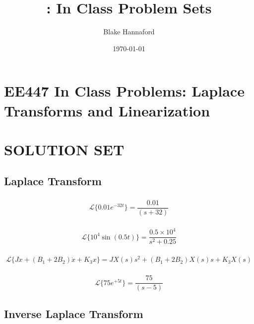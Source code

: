 \documentclass{article}	%
\title{\EEcourse: In Class Problem Sets  }
\author{Blake Hannaford}
\date{\today}
\newcommand{\sL}{\mathcal{L}}
\begin{document}
\maketitle


\section{EE447 In Class Problems: Laplace Transforms and Linearization}	%



\section*{SOLUTION SET}	%

\subsection{Laplace Transform}          %
 \subsubsection{}

%
%
\[
 \sL\{0.01e^{-32t} \} = \frac {0.01} {(s+32)}
\]

 \subsubsection{}

%
\[
 \sL \{ 10^4 \sin(0.5t)\} = \frac{0.5\times 10^4} {s^2+0.25}
\]
\subsubsection{}

%
%
\[
 \sL \{ J\ddot{x} + (B_1+2B_2)\dot{x}+K_3x\} = JX(s)s^2 + (B_1+2B_2)X(s)s + K_3X(s)
\]


\subsubsection{}

%
\[
 \sL \{ 75e^{+5t} \} = \frac {75} {(s-5)}
\]

\subsection{Inverse Laplace Transform}
\end{document}
